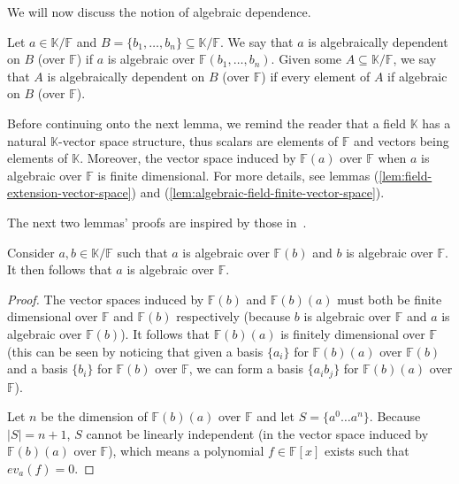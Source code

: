 We will now discuss the notion of algebraic dependence.

\begin{defn}
	Let $a \in \mathbb K / \mathbb F$ and $B = \{b _1, \ldots, b _n \} \subseteq  \mathbb K / \mathbb F$. We say that $a$ is algebraically dependent on $B$ (over $ \mathbb{F} $) if $a$ is algebraic over $\mathbb F(b _1, \ldots, b _n )$. Given some $A \subseteq  \mathbb K / \mathbb{F} $, we say that $A$ is algebraically dependent on $B$ (over $\mathbb{F} $) if every element of $A$ if algebraic on $B$ (over $\mathbb{F} $).
\end{defn}

Before continuing onto the next lemma, we remind the reader that a field $\mathbb{K}$ has a natural $\mathbb{K}$-vector space structure, thus scalars are elements of $\mathbb{F} $ and vectors being elements of $\mathbb K$. Moreover, the vector space induced by $\mathbb{F} (a)$ over $\mathbb{F} $ when $a$ is algebraic over $\mathbb{F} $ is finite dimensional. For more details, see lemmas (\ref{lem:field-extension-vector-space}) and (\ref{lem:algebraic-field-finite-vector-space}).

The next two lemmas' proofs are inspired by those in~\cite[213]{oxley1}.

\begin{lemma}\label{lem:algebraic-transitivity}
	Consider $a, b \in \mathbb K / \mathbb{F} $ such that $a$ is algebraic over $\mathbb{F}(b) $ and $b$ is algebraic over $\mathbb{F}$. It then follows that $a$ is algebraic over $\mathbb{F}$.
\end{lemma}

\begin{proof}
	The vector spaces induced by $\mathbb{F} (b)$ and $\mathbb{F} (b)(a)$ must both be finite dimensional over $\mathbb{F} $ and $\mathbb{F} (b)$ respectively (because $b$ is algebraic over $\mathbb{F} $ and $a$ is algebraic over $\mathbb{F} (b)$). It follows that $\mathbb{F} (b)(a)$ is finitely dimensional over $\mathbb{F}$ (this can be seen by noticing that given a basis $\{a _i \}$ for $\mathbb{F} (b)(a)$ over $\mathbb{F} (b)$ and a basis $\{b _i\}$ for $\mathbb{F} (b)$ over $\mathbb{F} $, we can form a basis $\{a _i b _j\}$ for $\mathbb{F} (b)(a)$ over $\mathbb{F} $).

	Let $n$ be the dimension of $\mathbb{F} (b)(a)$ over $\mathbb{F} $ and let $S = \{a ^0 \ldots a ^n \}$. Because $|S| = n + 1$, $S$ cannot be linearly independent (in the vector space induced by $\mathbb{F} (b)(a)$ over $\mathbb{F} $), which means a polynomial $f \in \mathbb{F} [x]$ exists such that $ev_a(f) = 0$.
\end{proof}

